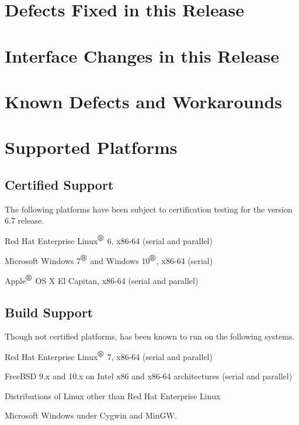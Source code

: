 \documentclass{article}
\begin{document}
\newpage
\section{Defects Fixed in this Release}



\newpage
\section{Interface Changes in this Release}



\newpage
\section{Known Defects and Workarounds}



\newpage
\section{Supported Platforms}
\subsection*{Certified Support}
The following platforms have been subject to certification testing for the
\Xyce{} version 6.7 release.
\begin{XyceItemize}
     \item Red Hat Enterprise Linux${}^{\mbox{\textregistered}}$ 6, x86-64 (serial and parallel)
     \item Microsoft Windows 7${}^{\mbox{\textregistered}}$ and Windows 10${}^{\mbox{\textregistered}}$, x86-64 (serial)
     \item Apple${}^{\mbox{\textregistered}}$ OS X El Capitan, x86-64 (serial and parallel)
\end{XyceItemize}

\subsection*{Build Support}
Though not certified platforms, \Xyce{} has been known to run on the following
systems.
\begin{XyceItemize}
     \item Red Hat Enterprise Linux${}^{\mbox{\textregistered}}$ 7, x86-64 (serial and parallel)
     \item FreeBSD 9.x and 10.x on Intel x86 and x86-64 architectures (serial and parallel)
     \item Distributions of Linux other than Red Hat Enterprise Linux
     \item Microsoft Windows under Cygwin and MinGW.
\end{XyceItemize}
\end{document}
